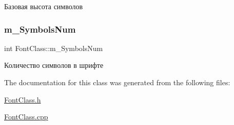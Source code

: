 Базовая высота символов 

\mbox{\label{class_font_class_a960601d7c7d1786b28a2f6e9988bd63d}} 
\subsubsection{\texorpdfstring{m\+\_\+\+Symbols\+Num}{m\_SymbolsNum}}
{\footnotesize\ttfamily int Font\+Class\+::m\+\_\+\+Symbols\+Num\hspace{0.3cm}{\ttfamily [private]}}



Количество символов в шрифте 



The documentation for this class was generated from the following files\+:\begin{DoxyCompactItemize}
\item 
\hyperlink{_font_class_8h}{Font\+Class.\+h}\item 
\hyperlink{_font_class_8cpp}{Font\+Class.\+cpp}\end{DoxyCompactItemize}
